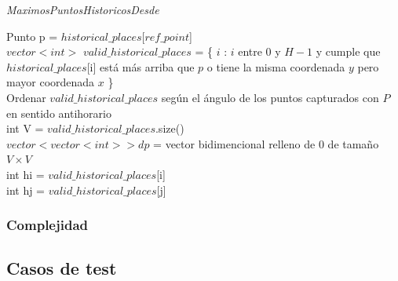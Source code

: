 \begin{algorithm}[H]
	\caption{\textit{MaximosPuntosHistoricosDesde}}
	Punto p = $historical\_places$[$ref\_point$] \\

    $vector<int>$ $valid\_historical\_places$ = \{ $i$ : $i$ entre 0 y $H-1$ y cumple que $historical\_places$[i] está más arriba que $p$ o tiene la misma coordenada $y$ pero mayor coordenada $x$ \} \\
    
    Ordenar $valid\_historical\_places$ según el ángulo de los puntos capturados con $P$ en sentido antihorario \\
    
    int V = $valid\_historical\_places$.size() \\
    $vector< vector<int> > dp$ = vector bidimencional relleno de 0 de tamaño $V \times V$ \\

     {
        int hi = $valid\_historical\_places$[i] \\
         {
            int hj = $valid\_historical\_places$[j] \\
        }
    }

\end{algorithm}

\subsubsection{Complejidad}

\subsection{Casos de test}